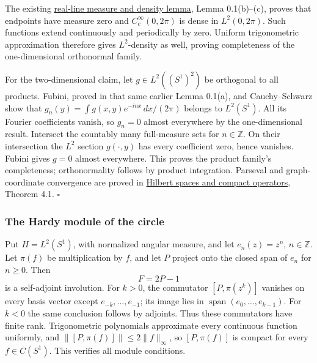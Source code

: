 \documentclass[
  11pt,
]{article}
\begin{document}
The existing
\href{https://kokunoyumeto.github.io/open-math-courses/courses/foundations-of-von-neumann-algebras/compact-and-trace-class-operators-the-predual-of-b-h-and-the-operator-topologies.html\#oa-fnd-lt-17}{real-line
measure and density lemma}, Lemma 0.1(b)--(c), proves that endpoints
have measure zero and \(C_c^\infty(0,2\pi)\) is dense in
\(L^2(0,2\pi)\). Such functions extend continuously and periodically by
zero. Uniform trigonometric approximation therefore gives
\(L^2\)-density as well, proving completeness of the one-dimensional
orthonormal family.

For the two-dimensional claim, let \(g\in L^2((S^1)^2)\) be orthogonal
to all products. Fubini, proved in that same earlier Lemma 0.1(a), and
Cauchy--Schwarz show that \(g_n(y)=\int g(x,y)e^{-inx}\,dx/(2\pi)\)
belongs to \(L^2(S^1)\). All its Fourier coefficients vanish, so
\(g_n=0\) almost everywhere by the one-dimensional result. Intersect the
countably many full-measure sets for \(n\in\mathbb Z\). On their
intersection the \(L^2\) section \(g(\cdot,y)\) has every coefficient
zero, hence vanishes. Fubini gives \(g=0\) almost everywhere. This
proves the product family's completeness; orthonormality follows by
product integration. Parseval and graph-coordinate convergence are
proved in
\href{https://kokunoyumeto.github.io/open-math-courses/courses/foundations-of-von-neumann-algebras/hilbert-spaces-and-compact-operators.html}{Hilbert
spaces and compact operators}, Theorem 4.1. \(\square\)

\subsubsection{The Hardy module of the
circle}\label{the-hardy-module-of-the-circle}

Put \(H=L^2(S^1)\), with normalized angular measure, and let
\(e_n(z)=z^n\), \(n\in\mathbb Z\). Let \(\pi(f)\) be multiplication by
\(f\), and let \(P\) project onto the closed span of \(e_n\) for
\(n\geq0\). Then \[
F=2P-1
\tag{5.1}
\] is a self-adjoint involution. For \(k>0\), the commutator
\([P,\pi(z^k)]\) vanishes on every basis vector except
\(e_{-k},\ldots,e_{-1}\); its image lies in
\(\operatorname{span}(e_0,\ldots,e_{k-1})\). For \(k<0\) the same
conclusion follows by adjoints. Thus these commutators have finite rank.
Trigonometric polynomials approximate every continuous function
uniformly, and \(\|[P,\pi(f)]\|\leq2\|f\|_\infty\), so \([P,\pi(f)]\) is
compact for every \(f\in C(S^1)\). This verifies all module conditions.
\end{document}
